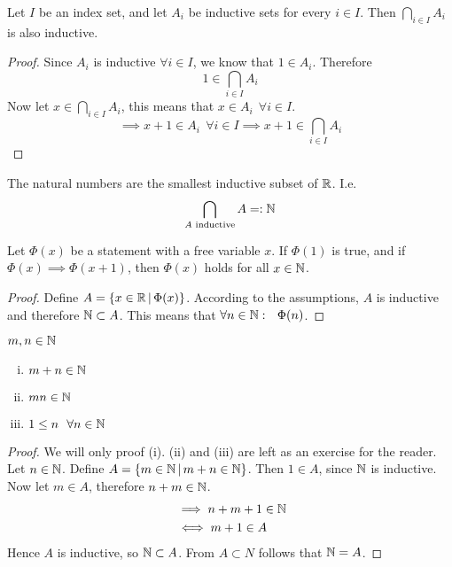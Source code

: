 \documentclass[../../script.tex]{subfiles}
\begin{document}
\begin{lem}
Let $I$ be an index set, and let $A_i$ be inductive sets for every $i \in I$. Then $\bigcap_{i \in I} A_i$ is also inductive.
\end{lem}
\begin{proof}
Since $A_i$ is inductive $\forall i \in I$, we know that $1 \in A_i$. Therefore 
\begin{equation}
	1 \in \bigcap_{i \in I} A_i
\end{equation}
Now let $x \in \bigcap_{i \in I} A_i$, this means that $x \in A_i ~~\forall i \in I$.
\begin{equation}
	\implies x + 1 \in A_i ~~\forall i \in I \implies x + 1 \in \bigcap_{i \in I} A_i
\end{equation}
\end{proof}

\begin{defi}
The natural numbers are the smallest inductive subset of $\mathbb{R}$. I.e.
\[
	\bigcap_{A \text{ inductive}} A =: \mathbb{N}
\]
\end{defi}

\begin{thm}
Let $\Phi(x)$ be a statement with a free variable $x$. If $\Phi(1)$ is true, and if $\Phi(x) \implies \Phi(x + 1)$, then $\Phi(x)$ holds for all $x \in \mathbb{N}$.
\end{thm}
\begin{proof}
Define $A = \{x \in \mathbb{R} \,\vert\, \Phi(x)\}$. According to the assumptions, $A$ is inductive and therefore $\mathbb{N} \subset A$. This means that $\forall n \in \mathbb{N}: ~~\Phi(n)$.
\end{proof}

\begin{cor}
$m, n \in \mathbb{N}$
\begin{enumerate}[(i)]
	\item $m + n \in \mathbb{N}$
	\item $mn \in \mathbb{N}$
	\item $1 \le n ~~\forall n \in \mathbb{N}$
\end{enumerate}
\end{cor}
\begin{proof}
We will only proof (i). (ii) and (iii) are left as an exercise for the reader. Let $n \in \mathbb{N}$. Define $A = \{m \in \mathbb{N} \,\vert\, m + n \in \mathbb{N}\}$. Then $1 \in A$, since $\mathbb{N}$ is inductive. Now let $m \in A$, therefore $n + m \in \mathbb{N}$.
\begin{align}
	&\implies n + m + 1 \in \mathbb{N} \\
	&\iff m + 1 \in A
\end{align}
Hence $A$ is inductive, so $\mathbb{N} \subset A$. From $A \subset N$ follows that $\mathbb{N} = A$.
\end{proof}
\end{document}
